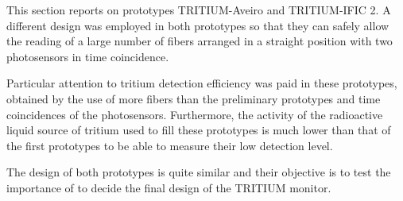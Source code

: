 This section reports on prototypes TRITIUM-Aveiro and TRITIUM-IFIC 2. A different design was employed in both prototypes so that they can safely allow the reading of a large number of fibers arranged in a straight position with two photosensors in time coincidence. 

Particular attention to tritium detection efficiency was paid in these prototypes, obtained by the use of more fibers than the preliminary prototypes and time coincidences of the photosensors. Furthermore, the activity of the radioactive liquid source of tritium used to fill these prototypes is much lower than that of the first prototypes to be able to measure their low detection level.

The design of both prototypes is quite similar and their objective is to test the importance of to decide the final design of the TRITIUM monitor.
